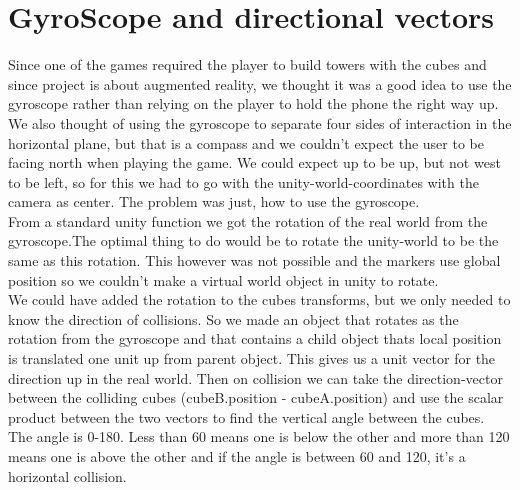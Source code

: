 \section{GyroScope and directional vectors}
Since one of the games required the player to build towers with the cubes and since project is about augmented reality, we thought it was a good idea to use the gyroscope rather than relying on the player to hold the phone the right way up. We also thought of using the gyroscope to separate four sides of interaction in the horizontal plane, but that is a compass and we couldn't expect the user to be facing north when playing the game. We could expect up to be up, but not west to be left, so for this we had to go with the unity-world-coordinates with the camera as center. The problem was just, how to use the gyroscope.\\
From a standard unity function we got the rotation of the real world from the gyroscope.The optimal thing to do would be to rotate the unity-world to be the same as this rotation. This however was not possible and the markers use global position so we couldn't make a virtual world object in unity to rotate.\\
We could have added the rotation to the cubes transforms, but we only needed to know the direction of collisions. So we made an object that rotates as the rotation from the gyroscope and that contains a child object thats local position is translated one unit up from parent object. This gives us a unit vector for the direction up in the real world. Then on collision we can take the direction-vector between the colliding cubes (cubeB.position - cubeA.position) and use the scalar product between the two vectors to find the vertical angle between the cubes. The angle is 0-180. Less than 60 means one is below the other and more than 120 means one is above the other and if the angle is between 60 and 120, it's a horizontal collision.




